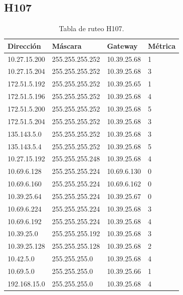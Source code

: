 \documentclass[12pt,titlepage]{article}
\begin{document}
\subsection{H107}
\begin{table}
  \begin{center}
    \begin{tabular}{|l|l|l|l|}
      \hline
        \bf{Direcci\'on} & \bf{M\'ascara} & \bf{Gateway} & \bf{M\'etrica} \\
      \hline 
	10.27.15.200  & 255.255.255.252 & 10.39.25.68 & 1 \\
        10.27.15.204  & 255.255.255.252 & 10.39.25.68 & 3 \\
        172.51.5.192  & 255.255.255.252 & 10.39.25.65 & 1 \\
        172.51.5.196  & 255.255.255.252 & 10.39.25.68 & 4 \\
        172.51.5.200  & 255.255.255.252 & 10.39.25.68 & 5 \\
        172.51.5.204  & 255.255.255.252 & 10.39.25.68 & 3 \\
        135.143.5.0   & 255.255.255.252 & 10.39.25.68 & 3 \\
        135.143.5.4   & 255.255.255.252 & 10.39.25.68 & 5 \\ 	
	10.27.15.192  & 255.255.255.248 & 10.39.25.68 & 4 \\
	10.69.6.128   & 255.255.255.224 & 10.69.6.130 & 0 \\
        10.69.6.160   & 255.255.255.224 & 10.69.6.162 & 0 \\
	10.39.25.64   & 255.255.255.224 & 10.39.25.67 & 0 \\       
	10.69.6.224   & 255.255.255.224 & 10.39.25.68 & 3 \\
	10.69.6.192   & 255.255.255.224 & 10.39.25.68 & 4 \\	
	10.39.25.0    & 255.255.255.192 & 10.39.25.68 & 3 \\
	10.39.25.128  & 255.255.255.128 & 10.39.25.68 & 2 \\
	10.42.5.0     & 255.255.255.0 & 10.39.25.68 & 4 \\
        10.69.5.0     & 255.255.255.0 & 10.39.25.66 & 1 \\
        192.168.15.0  & 255.255.255.0 & 10.39.25.68 & 4 \\  
    \hline
    \end{tabular} \\
  \end{center}
  \caption{Tabla de ruteo H107.}
\end{table}
\newpage
\end{document}
